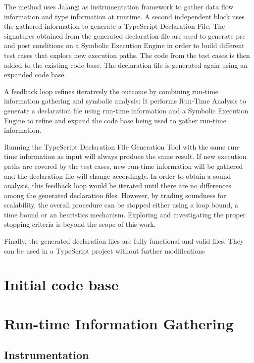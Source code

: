 The method uses Jalangi as instrumentation framework to gather data flow information and type information at runtime. A second independent block uses the gathered information to generate a TypeScript Declaration File. The signatures obtained from the generated declaration file are used to generate pre and post conditions on a Symbolic Execution Engine in order to build different test cases that explore new execution paths. The code from the test cases is then added to the existing code base. The declaration file is generated again using an expanded code base.

A feedback loop refines iteratively the outcome by combining run-time information gathering and symbolic analysis: It performs Run-Time Analysis to generate a declaration file using run-time information and a Symbolic Execution Engine to refine and expand the code base being used to gather run-time information.

Running the TypeScript Declaration File Generation Tool with the same run-time information as input will always produce the same result. If new execution paths are covered by the test cases, new run-time information will be gathered and the declaration file will change accordingly. In order to obtain a sound analysis, this feedback loop would be iterated until there are no differences among the generated declaration files. However, by trading soundness for scalability, the overall procedure can be stopped either using a loop bound, a time bound or an heuristics mechanism. Exploring and investigating the proper stopping criteria is beyond the scope of this work.  

Finally, the generated declaration files are fully functional and valid files. They can be used in a TypeScript project without further modifications


\section{Initial code base}

\section{Run-time Information Gathering} \label{run-time-information-gathering}
\subsection{Instrumentation}
